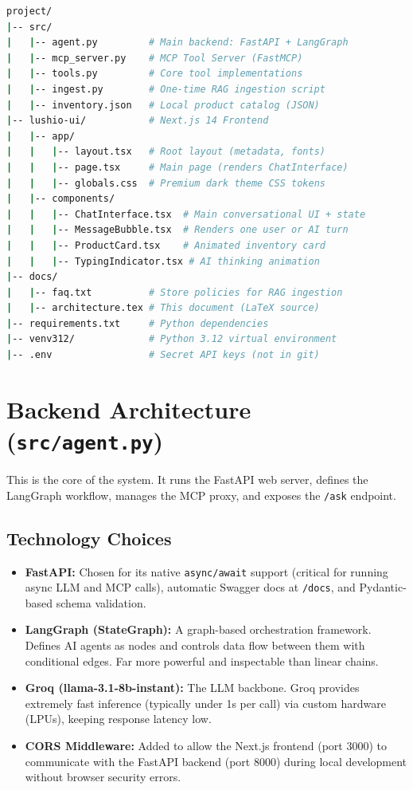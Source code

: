 \documentclass[12pt]{article}
\begin{document}
\begin{lstlisting}[language=bash]
project/
|-- src/
|   |-- agent.py         # Main backend: FastAPI + LangGraph
|   |-- mcp_server.py    # MCP Tool Server (FastMCP)
|   |-- tools.py         # Core tool implementations
|   |-- ingest.py        # One-time RAG ingestion script
|   |-- inventory.json   # Local product catalog (JSON)
|-- lushio-ui/           # Next.js 14 Frontend
|   |-- app/
|   |   |-- layout.tsx   # Root layout (metadata, fonts)
|   |   |-- page.tsx     # Main page (renders ChatInterface)
|   |   |-- globals.css  # Premium dark theme CSS tokens
|   |-- components/
|   |   |-- ChatInterface.tsx  # Main conversational UI + state
|   |   |-- MessageBubble.tsx  # Renders one user or AI turn
|   |   |-- ProductCard.tsx    # Animated inventory card
|   |   |-- TypingIndicator.tsx # AI thinking animation
|-- docs/
|   |-- faq.txt          # Store policies for RAG ingestion
|   |-- architecture.tex # This document (LaTeX source)
|-- requirements.txt     # Python dependencies
|-- venv312/             # Python 3.12 virtual environment
|-- .env                 # Secret API keys (not in git)
\end{lstlisting}

\section{Backend Architecture (\texttt{src/agent.py})}

This is the core of the system. It runs the FastAPI web server, defines the LangGraph workflow, manages the MCP proxy, and exposes the \texttt{/ask} endpoint.

\subsection{Technology Choices}

\begin{itemize}[leftmargin=1.5em]
    \item \textbf{FastAPI:} Chosen for its native \texttt{async/await} support (critical for running async LLM and MCP calls), automatic Swagger docs at \texttt{/docs}, and Pydantic-based schema validation.
    \item \textbf{LangGraph (StateGraph):} A graph-based orchestration framework. Defines AI agents as nodes and controls data flow between them with conditional edges. Far more powerful and inspectable than linear chains.
    \item \textbf{Groq (llama-3.1-8b-instant):} The LLM backbone. Groq provides extremely fast inference (typically under 1s per call) via custom hardware (LPUs), keeping response latency low.
    \item \textbf{CORS Middleware:} Added to allow the Next.js frontend (port 3000) to communicate with the FastAPI backend (port 8000) during local development without browser security errors.
\end{itemize}
\end{document}
